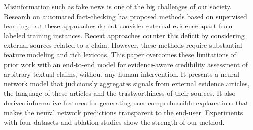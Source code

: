 Misinformation such as fake news is one of the big challenges of our society. Research on automated fact-checking has proposed methods based on supervised learning, but these approaches do not consider external evidence apart from labeled training instances. Recent approaches counter this deficit by considering external sources related to a claim. However, these methods require substantial feature modeling and rich lexicons. This paper overcomes these limitations of prior work with an end-to-end model for evidence-aware credibility assessment of arbitrary textual claims, without any human intervention. It presents a neural network model that judiciously aggregates signals from external evidence articles, the language of these articles and the trustworthiness of their sources. It also derives informative features for generating user-comprehensible explanations that makes the neural network predictions transparent to the end-user. Experiments with four datasets and ablation studies show the strength of our method.
